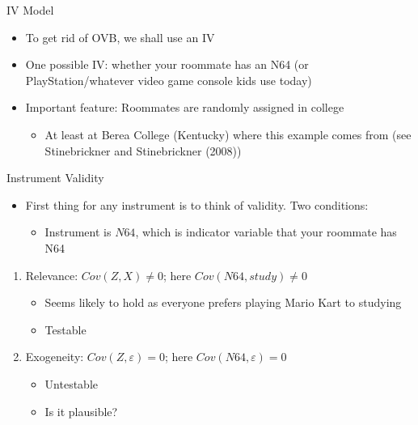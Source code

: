 \documentclass[aspectratio=169,11pt]{beamer}
\begin{document}
\begin{frame}{IV Model}
\begin{itemize}
\item To get rid of OVB, we shall use an IV
\medskip
\item One possible IV: whether your roommate has an N64 (or PlayStation/whatever video game console kids use today)
\medskip
\item Important feature: Roommates are randomly assigned in college
\begin{itemize}
\item At least at Berea College (Kentucky) where this example comes from (see Stinebrickner and Stinebrickner (2008))
\end{itemize}
\end{itemize}
\end{frame}

\begin{frame}{Instrument Validity}
\begin{itemize}
\item First thing for any instrument is to think of validity. Two conditions:
\begin{itemize}
\item Instrument is $N64$, which is indicator variable that your roommate has N64
\end{itemize}
\end{itemize}
\begin{enumerate}
\item Relevance: $Cov(Z,X)\neq 0$; here $Cov(N64,study)\neq 0$
\begin{itemize}
\item Seems likely to hold as everyone prefers playing Mario Kart to studying
\item Testable
\end{itemize}
\medskip
\item Exogeneity: $Cov(Z,\varepsilon)= 0$; here $Cov(N64,\varepsilon)=0$
\begin{itemize}
\item Untestable
\item Is it plausible? 
\end{itemize}
\end{enumerate}
\end{frame}
\end{document}
